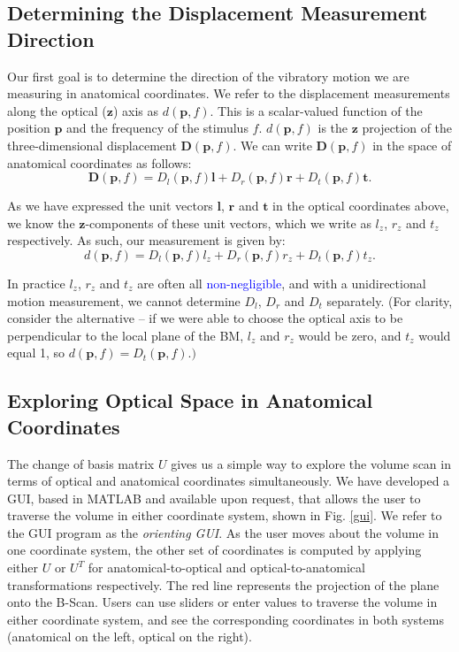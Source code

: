 \documentclass[preprint,NumberedRefs]{JASA}
\begin{document}
\subsection{Determining the Displacement Measurement Direction}
\par{Our first goal is to determine the direction of the vibratory motion we are measuring in anatomical coordinates. We refer to the displacement measurements along the optical ($\mathbf{z}$) axis as $d(\mathbf{p},f)$. This is a scalar-valued function of the position $\mathbf{p}$ and the frequency of the stimulus $f$. $d(\mathbf{p},f)$ is the $\mathbf{z}$ projection of the three-dimensional displacement $\mathbf{D}(\mathbf{p},f)$. We can write $\mathbf{D}(\mathbf{p},f)$ in the space of anatomical coordinates as follows:
\begin{equation}
\mathbf{D}(\mathbf{p},f) = D_l(\mathbf{p},f)\mathbf{l} + D_r(\mathbf{p},f)\mathbf{r} + D_t(\mathbf{p},f)\mathbf{t}.
\end{equation}}
\par{As we have expressed the unit vectors $\mathbf{l}$, $\mathbf{r}$ and $\mathbf{t}$ in the optical coordinates above, we know the $\mathbf{z}$-components of these unit vectors, which we write as $l_z$, $r_z$ and $t_z$ respectively. As such, our measurement is given by: \begin{equation}d(\mathbf{p},f) = D_l(\mathbf{p},f)l_z + D_r(\mathbf{p},f)r_z + D_t(\mathbf{p},f)t_z.
\end{equation}}
\par{In practice $l_z$, $r_z$ and $t_z$ are often all \textcolor{blue}{non-negligible}, and with a unidirectional motion measurement, we cannot determine $D_l$, $D_r$ and $D_t$ separately. (For clarity, consider the alternative -- if we were able to choose the optical axis to be perpendicular to the local plane of the BM, $l_z$ and $r_z$ would be zero, and $t_z$ would equal 1, so $d(\mathbf{p},f) =  D_t(\mathbf{p},f).)$}
\subsection{Exploring Optical Space in Anatomical Coordinates}

\par{The change of basis matrix $U$ gives us a simple way to explore the volume scan in terms of optical and anatomical coordinates simultaneously. We have developed a GUI, based in MATLAB and available upon request, that allows the user to traverse the volume in either coordinate system, shown in Fig. \ref{gui}. We refer to the GUI program as the \textit{orienting GUI}. As the user moves about the volume in one coordinate system, the other set of coordinates is computed by applying either $U$ or $U^T$ for anatomical-to-optical and optical-to-anatomical transformations respectively.  The red line represents the projection of the plane onto the B-Scan. Users can use sliders or enter values to traverse the volume in either coordinate system, and see the corresponding coordinates in both systems (anatomical on the left, optical on the right).} 
\end{document}

